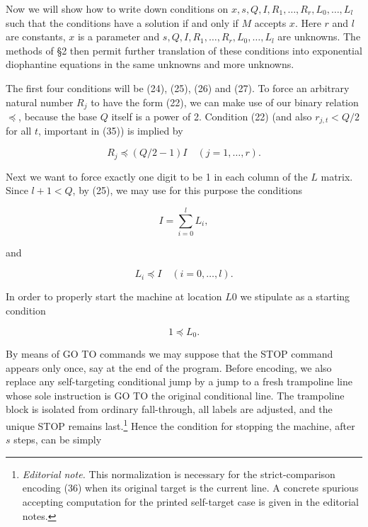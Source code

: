 \documentclass[11pt,leqno]{article}
\newcommand{\origpage}[1]{\marginnote{\footnotesize\textbf{[#1]}}}
\newcommand{\ednote}[1]{\footnote{\textit{Editorial note.} #1}}
\begin{document}
Now we will show how to write down conditions on $x, s, Q, I, R_{1}, \ldots, R_{r}, L_{0}, \ldots, L_{l}$ such that the conditions have a solution if and only if $M$ accepts $x$. Here $r$ and $l$ are constants, $x$ is a parameter and $s, Q, I, R_{1}, \ldots, R_{r}, L_{0}, \ldots, L_{l}$ are unknowns. The methods of \S2 then permit further translation of these conditions into exponential diophantine equations in the same unknowns and more unknowns.

The first four conditions will be (24), (25), (26) and (27). To force an arbitrary natural number $R_{j}$ to have the form (22), we can make use of our binary relation $\preccurlyeq$, because the base $Q$ itself is a power of 2. Condition (22) (and also $r_{j, t}<Q / 2$ for all $t$, important in (35)) is implied by

\begin{equation*}
R_{j} \preccurlyeq(Q / 2-1) I \quad(j=1, \ldots, r) . \tag{29}\label{eq:29}
\end{equation*}

Next we want to force exactly one digit to be 1 in each column of the $L$ matrix. Since $l+1<Q$, by (25), \origpage{825}we may use for this purpose the conditions

\begin{equation*}
I=\sum_{i=0}^{l} L_{i}, \tag{30}\label{eq:30}
\end{equation*}

\noindent and\nopagebreak

\begin{equation*}
L_{i} \preccurlyeq I \quad(i=0, \ldots, l) . \tag{31}\label{eq:31}
\end{equation*}

In order to properly start the machine at location $L 0$ we stipulate as a starting condition

\begin{equation*}
1 \preccurlyeq L_{0} . \tag{32}\label{eq:32}
\end{equation*}

By means of GO TO commands we may suppose that the STOP command appears only once, say at the end of the program. Before encoding, we also replace any self-targeting conditional jump by a jump to a fresh trampoline line whose sole instruction is GO TO the original conditional line. The trampoline block is isolated from ordinary fall-through, all labels are adjusted, and the unique STOP remains last.\ednote{This normalization is necessary for the strict-comparison encoding (36) when its original target is the current line. A concrete spurious accepting computation for the printed self-target case is given in the editorial notes.} Hence the condition for stopping the machine, after $s$ steps, can be simply
\end{document}
